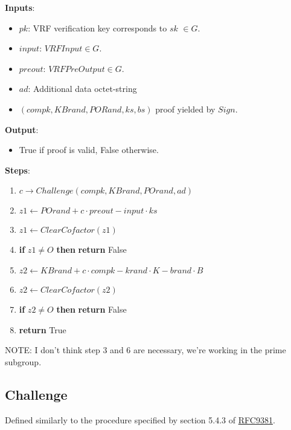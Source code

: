 \documentclass[
]{article}
\providecommand{\tightlist}{%
  \setlength{\itemsep}{0pt}\setlength{\parskip}{0pt}}
\begin{document}
\textbf{Inputs}:

\begin{itemize}
\tightlist
\item
  \(pk\): VRF verification key corresponds to \(sk\) \(\in G\).
\item
  \(input\): \(VRFInput \in G\).
\item
  \(preout\): \(VRFPreOutput \in G\).
\item
  \(ad\): Additional data octet-string
\item
  \((compk, KBrand, PORand, ks, bs)\) proof yielded by \(Sign\).
\end{itemize}

\textbf{Output}:

\begin{itemize}
\tightlist
\item
  True if proof is valid, False otherwise.
\end{itemize}

\textbf{Steps}:

\begin{enumerate}
\def\labelenumi{\arabic{enumi}.}
\tightlist
\item
  \(c \rightarrow Challenge(compk, KBrand, POrand, ad)\)
\item
  \(z1 \leftarrow POrand + c \cdot preout - input \cdot ks\)
\item
  \(z1 \leftarrow ClearCofactor(z1)\)
\item
  \textbf{if} \(z1 \neq O\) \textbf{then} \textbf{return} False
\item
  \(z2 \leftarrow KBrand + c \cdot compk - krand \cdot K - brand \cdot B\)
\item
  \(z2 \leftarrow ClearCofactor(z2)\)
\item
  \textbf{if} \(z2 \neq O\) \textbf{then} \textbf{return} False
\item
  \textbf{return} True
\end{enumerate}

NOTE: I don't think step 3 and 6 are necessary, we're working in the
prime subgroup.

\hypertarget{challenge}{%
\subsection{Challenge}\label{challenge}}

Defined similarly to the procedure specified by section 5.4.3 of
\href{https://datatracker.ietf.org/doc/rfc9381/}{RFC9381}.
\end{document}
